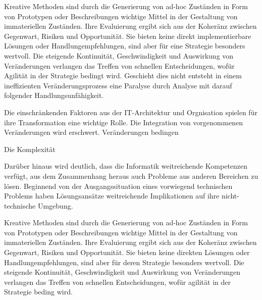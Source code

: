 Kreative Methoden sind durch die Generierung von ad-hoc Zuständen in Form von Prototypen oder Beschreibungen wichtige Mittel in der Gestaltung von immateriellen Zuständen. Ihre Evaluierung ergibt sich aus der Koheränz zwischen Gegenwart, Risiken und Opportunität. Sie bieten keine direkt implementierbare Lösungen oder Handlungempfehlungen, sind aber für eine Strategie besonders wertvoll. Die steigende Kontinuität, Geschwindigkeit und Auswirkung von Veränderungen verlangen das Treffen von schnellen Entscheidungen, wofür Agilität in der Strategie bedingt wird. Geschieht dies nicht entsteht in einem ineffizienten Veränderungsprozess eine Paralyse durch Analyse mit darauf folgender Handlungsunfähigkeit. 

Die einschränkenden Faktoren aus der IT-Architektur und Orgnisation spielen für ihre Transformation eine wichtige Rolle. Die Integration von vorgenommenen Veränderungen wird erschwert. Veränderungen bedingen


Die Komplexität

Darüber hinaus wird deutlich, dass die Informatik weitreichende Kompetenzen verfügt, aus dem Zusammenhang heraus auch Probleme aus anderen Bereichen zu lösen. Beginnend von der Ausgangssituation eines vorwiegend technischen Problems haben Lösungsansätze weitreichende Implikationen auf ihre nicht-technische Umgebung.

Kreative Methoden sind durch die Generierung von ad-hoc Zuständen in Form von Prototypen oder Beschreibungen wichtige Mittel in der Gestaltung von immateriellen Zuständen. Ihre Evaluierung ergibt sich aus der Koheränz zwischen Gegenwart, Risiken und Opportunität. Sie bieten keine direkten Lösungen oder Handlungempfehlungen, sind aber für deren Strategie besonders wertvoll. Die steigende Kontinuität, Geschwindigkeit und Auswirkung von Veränderungen verlangen das Treffen von schnellen Entscheidungen, wofür agilität in der Strategie beding wird.